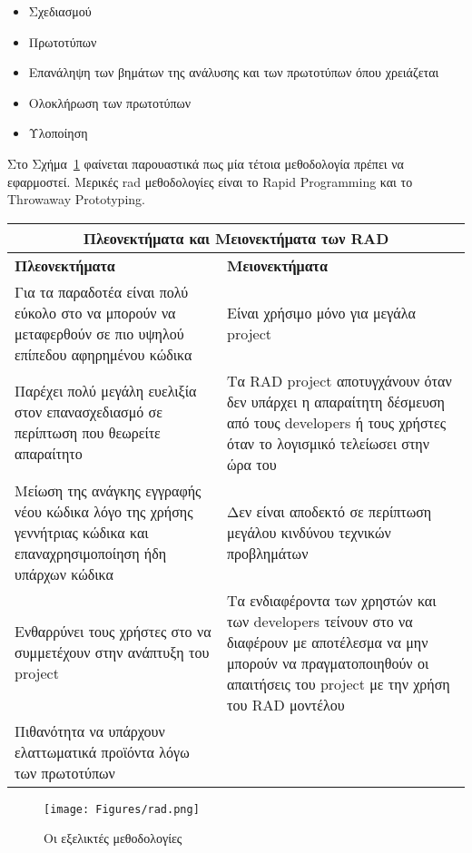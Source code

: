 \begin{itemize}
    \item Σχεδιασμού
    \item Πρωτοτύπων
    \item Επανάληψη των βημάτων της ανάλυσης και των πρωτοτύπων όπου χρειάζεται
    \item Ολοκλήρωση των πρωτοτύπων
    \item Υλοποίηση
\end{itemize}

Στο Σχήμα~\ref{fig:rad} φαίνεται παρουαστικά πως μία τέτοια μεθοδολογία πρέπει να εφαρμοστεί. Μερικές rad μεθοδολογίες είναι το Rapid Programming και το Throwaway Prototyping.

\newpage
\begin{center}
    \begin{tabular}{| p{8cm} | p{8cm} |}
        \hline
        \multicolumn{2}{|c|}{\textbf{Πλεονεκτήματα και Μειονεκτήματα των RAD}} \\
        \hline
        \textbf{Πλεονεκτήματα} & \textbf{Μειονεκτήματα} \\
        \hline
        Για τα παραδοτέα είναι πολύ εύκολο στο να μπορούν να μεταφερθούν σε πιο υψηλού επίπεδου αφηρημένου κώδικα & Είναι χρήσιμο μόνο για μεγάλα project \\
        \hline
        Παρέχει πολύ μεγάλη ευελιξία στον επανασχεδιασμό σε περίπτωση που θεωρείτε απαραίτητο & Τα RAD project αποτυγχάνουν όταν δεν υπάρχει η απαραίτητη δέσμευση από τους developers ή τους χρήστες όταν το λογισμικό τελείωσει στην ώρα του \\
        \hline
        Μείωση της ανάγκης εγγραφής νέου κώδικα λόγο της χρήσης γεννήτριας κώδικα και επαναχρησιμοποίηση ήδη υπάρχων κώδικα & Δεν είναι αποδεκτό σε περίπτωση μεγάλου κινδύνου τεχνικών προβλημάτων \\
        \hline
        Ενθαρρύνει τους χρήστες στο να συμμετέχουν στην ανάπτυξη του project & Τα ενδιαφέροντα των χρηστών και των developers τείνουν στο να διαφέρουν με αποτέλεσμα να μην μπορούν να πραγματοποιηθούν οι απαιτήσεις του project με την χρήση του RAD μοντέλου \\
        \hline
        Πιθανότητα να υπάρχουν ελαττωματικά προϊόντα λόγω των πρωτοτύπων & \\
        \hline
    \end{tabular}
\end{center}

\begin{figure}[th]
    \centering
    \texttt{[image: Figures/rad.png]}
    \caption[Οι εξελικτές μεθοδολογίες]{Οι εξελικτές μεθοδολογίες}
    \label{fig:rad}
\end{figure}

